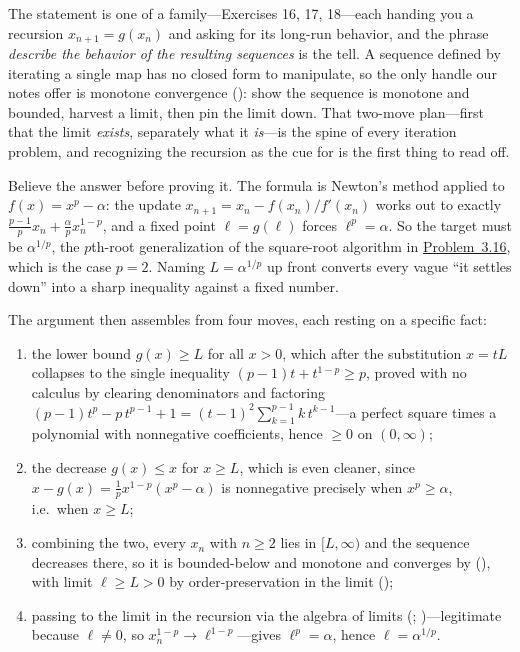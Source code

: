 \documentclass[main.tex]{subfiles}
\begin{document}
\begin{Reflection}
The statement is one of a family---Exercises 16, 17, 18---each handing you a recursion $x_{n+1}=g(x_{n})$
and asking for its long-run behavior, and the phrase \emph{describe the behavior of the resulting
sequences} is the tell. A sequence defined by iterating a single map has no closed form to manipulate, so
the only handle our notes offer is monotone convergence (): show the sequence is monotone and
bounded, harvest a limit, then pin the limit down. That two-move plan---first that the limit \emph{exists},
separately what it \emph{is}---is the spine of every iteration problem, and recognizing the recursion as
the cue for  is the first thing to read off.

Believe the answer before proving it. The formula is Newton's method applied to $f(x)=x^{p}-\alpha$: the
update $x_{n+1}=x_{n}-f(x_{n})/f'(x_{n})$ works out to exactly $\frac{p-1}{p}x_{n}+\frac{\alpha}{p}x_{n}^{1-p}$,
and a fixed point $\ell=g(\ell)$ forces $\ell^{p}=\alpha$. So the target must be $\alpha^{1/p}$, the
$p$th-root generalization of the square-root algorithm in \hyperlink{prob:3.16}{Problem~3.16}, which is the
case $p=2$. Naming $L=\alpha^{1/p}$ up front converts every vague ``it settles down'' into a sharp
inequality against a fixed number.

The argument then assembles from four moves, each resting on a specific fact:
\begin{enumerate}[leftmargin=1.7em,itemsep=3pt,topsep=2pt,label=\textnormal{(\arabic*)}]
  \item the lower bound $g(x)\ge L$ for all $x>0$, which after the substitution $x=tL$ collapses to the
        single inequality $(p-1)t+t^{1-p}\ge p$, proved with no calculus by clearing denominators and
        factoring $(p-1)t^{p}-p\,t^{p-1}+1=(t-1)^{2}\sum_{k=1}^{p-1}k\,t^{k-1}$---a perfect square times a
        polynomial with nonnegative coefficients, hence $\ge 0$ on $(0,\infty)$;
  \item the decrease $g(x)\le x$ for $x\ge L$, which is even cleaner, since
        $x-g(x)=\frac1p x^{1-p}(x^{p}-\alpha)$ is nonnegative precisely when $x^{p}\ge\alpha$, i.e.\ when
        $x\ge L$;
  \item combining the two, every $x_{n}$ with $n\ge 2$ lies in $[L,\infty)$ and the sequence decreases
        there, so it is bounded-below and monotone and converges by
         (), with limit $\ell\ge L>0$ by
        order-preservation in the limit ();
  \item passing to the limit in the recursion via the algebra of limits
        (; )---legitimate because $\ell\neq 0$,
        so $x_{n}^{1-p}\to\ell^{1-p}$---gives $\ell^{p}=\alpha$, hence $\ell=\alpha^{1/p}$.
\end{enumerate}


\end{Reflection}
\end{document}
